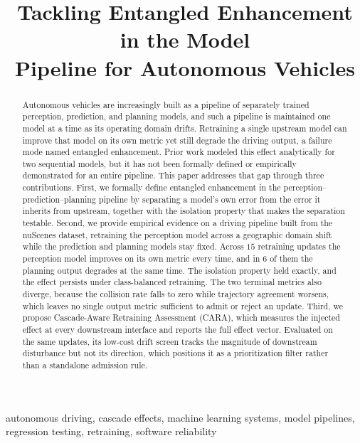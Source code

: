 \documentclass[conference]{IEEEtran}
\title{Tackling Entangled Enhancement in the Model\\
Pipeline for Autonomous Vehicles}
\author{\IEEEauthorblockN{Rashedul Arefin Ifty, Fumio Machida}
\IEEEauthorblockA{University of Tsukuba\\
Tsukuba, Japan\\
ifty.rashedul@sd.cs.tsukuba.ac.jp, machida@cs.tsukuba.ac.jp}}
\begin{document}
\maketitle
\thispagestyle{empty}

\begin{abstract}
Autonomous vehicles are increasingly built as a pipeline of separately trained
perception, prediction, and planning models, and such a pipeline is maintained one
model at a time as its operating domain drifts. Retraining a single upstream model
can improve that model on its own metric yet still degrade the driving output, a
failure mode named entangled enhancement. Prior work modeled this effect
analytically for two sequential models, but it has not been formally defined or
empirically demonstrated for an entire pipeline. This paper addresses that gap
through three contributions. First, we formally define entangled enhancement in the
perception--prediction--planning pipeline by separating a model's own error from the
error it inherits from upstream, together with the isolation property that makes the
separation testable. Second, we provide empirical evidence on a driving pipeline
built from the nuScenes dataset, retraining the perception model across a geographic
domain shift while the prediction and planning models stay fixed. Across $15$
retraining updates the perception model improves on its own metric every time, and
in $6$ of them the planning output degrades at the same time. The isolation property
held exactly, and the effect persists under class-balanced retraining. The two
terminal metrics also diverge, because the collision rate falls to zero while
trajectory agreement worsens, which leaves no single output metric sufficient to
admit or reject an update. Third, we propose Cascade-Aware Retraining Assessment
(CARA), which measures the injected effect at every downstream interface and reports
the full effect vector. Evaluated on the same updates, its low-cost drift screen
tracks the magnitude of downstream disturbance but not its direction, which
positions it as a prioritization filter rather than a standalone admission rule.
\end{abstract}

\begin{IEEEkeywords}
autonomous driving, cascade effects, machine learning systems, model pipelines,
regression testing, retraining, software reliability
\end{IEEEkeywords}
\end{document}
